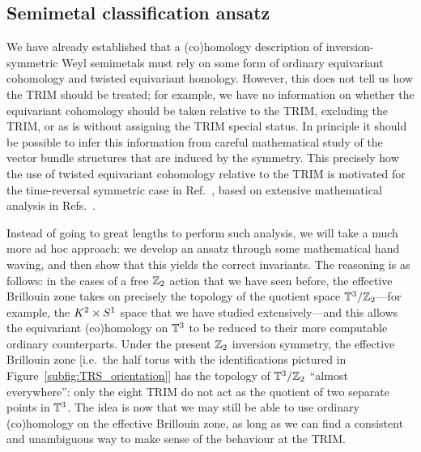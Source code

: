 \subsection{Semimetal classification ansatz}\label{sec:inversion-ansatz}

We have already established that a (co)homology description of inversion-symmetric Weyl semimetals must rely on some form of ordinary equivariant cohomology and twisted equivariant homology. However, this does not tell us how the TRIM should be treated; for example, we have no information on whether the equivariant cohomology should be taken relative to the TRIM, excluding the TRIM, or as is without assigning the TRIM special status. In principle it should be possible to infer this information from careful mathematical study of the vector bundle structures that are induced by the symmetry. This precisely how the use of twisted equivariant cohomology relative to the TRIM is motivated for the time-reversal symmetric case in Ref.~\cite{Thiang_equivariant}, based on extensive mathematical analysis in Refs.~\cite{NittisGomi_Quaternionic,NittisGomi_FKMM}.

Instead of going to great lengths to perform such analysis, we will take a much more ad hoc approach: we develop an ansatz through some mathematical hand waving, and then show that this yields the correct invariants. The reasoning is as follows: in the cases of a free $\mathbb{Z}_2$ action that we have seen before, the effective Brillouin zone takes on precisely the topology of the quotient space $\mathbb{T}^3/\mathbb{Z}_2$---for example, the $K^2\times S^1$ space that we have studied extensively---and this allows the equivariant (co)homology on $\mathbb{T}^3$ to be reduced to their more computable ordinary counterparts. Under the present $\mathbb{Z}_2$ inversion symmetry, the effective Brillouin zone [i.e.\ the half torus with the identifications pictured in Figure~\ref{subfig:TRS_orientation}] has the topology of $\mathbb{T}^3/\mathbb{Z}_2$ ``almost everywhere'': only the eight TRIM do not act as the quotient of two separate points in $\mathbb{T}^3$. The idea is now that we may still be able to use ordinary (co)homology on the effective Brillouin zone, as long as we can find a consistent and unambiguous way to make sense of the behaviour at the TRIM.

